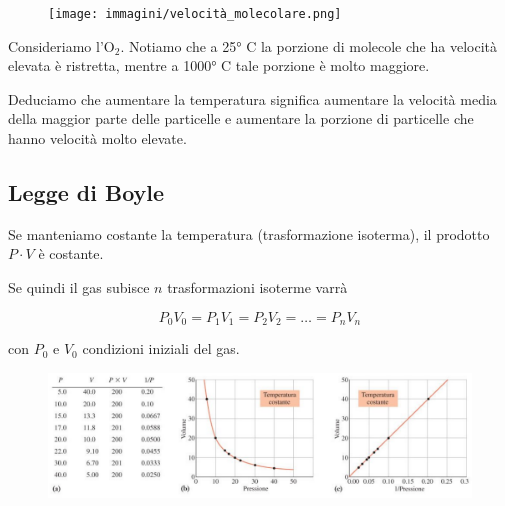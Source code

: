 
\begin{figure}[H]
    \centering
    \texttt{[image: immagini/velocità\_molecolare.png]}
\end{figure}

Consideriamo l'O$_2$. Notiamo che a 25° C la porzione di molecole che ha velocità elevata è ristretta, mentre a 1000° C tale porzione è molto maggiore.

Deduciamo che aumentare la temperatura significa aumentare la velocità media della maggior parte delle particelle e aumentare la porzione di particelle che hanno velocità molto elevate.

\subsection{Legge di Boyle}
Se manteniamo costante la temperatura (trasformazione isoterma), il prodotto $P \cdot V$ è costante.

Se quindi il gas subisce $n$ trasformazioni isoterme varrà

$$P_0V_0=P_1V_1=P_2V_2=\dots=P_nV_n$$

con $P_0$ e $V_0$ condizioni iniziali del gas.

\begin{figure}[htp]
    \centering
    \includegraphics[width=15cm]{immagini/Legge_di_Boyle.png}
\end{figure}


